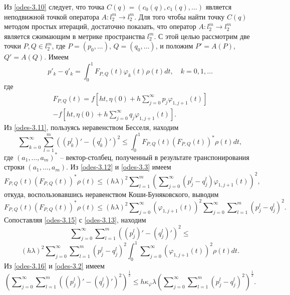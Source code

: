 Из  \eqref{odes-3.10} следует, что точка $C(q)=(c_0(q),c_1(q),\ldots)$ является неподвижной точкой оператора $A:l_2^m\to l_2^m$. Для того чтобы найти точку $C(q)$ методом простых итераций, достаточно показать, что оператор $A:l_2^m\to l_2^m$ является сжимающим в метрике пространства $l_2^m$. С этой целью рассмотрим две точки $P,Q\in l_2^m$, где $P=(p_0,\ldots)$, $Q=(q_0,\ldots)$, и положим $P'=A(P)$, $Q'=A(Q)$. Имеем
\begin{equation}\label{odes-3.11}
p'_k-q'_k=\int_{0}^1F_{P,Q}(t)\varphi_k(t)\rho(t)dt,\quad k=0,1,\ldots
\end{equation}
где
\begin{multline}\label{odes-3.12}
 F_{P,Q}(t)=f\left[ht,\eta(0)+ h\sum\nolimits_{j=0}^\infty p_j\varphi_{1,j+1}(t)\right] \\
  -f\left[ht,\eta(0)+ h\sum\nolimits_{j=0}^\infty q_j\varphi_{1,j+1}(t)\right].
\end{multline}
Из \eqref{odes-3.11}, пользуясь неравенством Бесселя, находим
 \begin{equation}\label{odes-3.13}
\sum\nolimits_{k=0}^\infty \sum_{l=1}^m((p^l_k)'-(q^l_k)')^2\le\int_{0}^1F_{P,Q}(t)(F_{P,Q}(t))^*\rho(t) dt,
\end{equation}
где $(a_1,\ldots,a_m)^*$ -- вектор-столбец, полученный в результате транспонирования строки $(a_1,\ldots,a_m)$.
Из \eqref{odes-3.12} и \eqref{odes-3.3}  имеем
 \begin{equation}\label{odes-3.15}
F_{P,Q}(t)(F_{P,Q}(t))^*\rho(t)\le (h\lambda)^2 \sum\nolimits_{l=1}^m  \left(\sum\nolimits_{j=0}^\infty( p^l_j-q^l_j)\varphi_{1,j+1}(t)\right)^2,
\end{equation}
откуда,  воспользовавшись неравенством Коши-Буняковского, выводим
$$
F_{P,Q}(t)(F_{P,Q}(t))^*\rho(t)\le(h\lambda)^2  \sum\nolimits_{j=0}^\infty(\varphi_{1,j+1}(t))^2 \sum\nolimits_{j=0}^\infty\sum\nolimits_{l=1}^m( p^l_j-q^l_j)^2.
$$
Сопоставляя \eqref{odes-3.15} с \eqref{odes-3.13}, находим
$$
\sum\nolimits_{j=0}^\infty\sum\nolimits_{l=1}^m((p^l_j)'-(q^l_j)')^2\le
$$
\begin{equation}\label{odes-3.16}
(h\lambda)^2 \sum\nolimits_{j=0}^\infty\sum\nolimits_{l=1}^m( p^l_j-q^l_j)^2\int_{0}^1 \sum\nolimits_{j=0}^\infty(\varphi_{1,j+1}(t))^2\rho(t) dt.
\end{equation}
Из  \eqref{odes-3.16}  и \eqref{odes-3.2} имеем
\begin{equation}\label{odes-3.17}
\left(\sum\nolimits_{j=0}^\infty\sum\nolimits_{l=1}^m((p^l_j)'-(q^l_j)')^2\right)^\frac12\le h\kappa_\varphi\lambda \left(\sum\nolimits_{j=0}^\infty\sum\nolimits_{l=1}^m( p^l_j-q^l_j)^2\right)^\frac12.
\end{equation}
